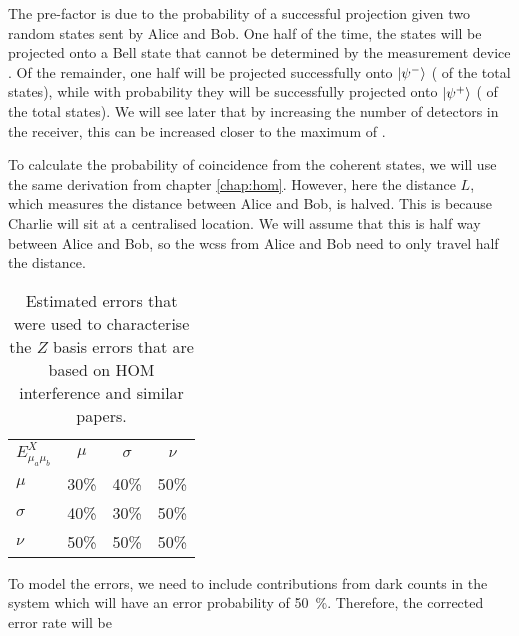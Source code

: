 The  pre-factor is due to the probability of a successful projection given two random states sent by Alice and Bob. One half of the time, the states will be projected onto a Bell state that cannot be determined by the measurement device \cite{walborn2003, Mattle1996}. Of the remainder, one half will be projected successfully onto $\ket{\psi^-}$ ( of the total states), while with probability  they will be successfully projected onto $\ket{\psi^+}$ ( of the total states). We will see later that by increasing the number of detectors in the receiver, this can be increased closer to the maximum of .

To calculate the probability of coincidence from the coherent states, we will use the same derivation from chapter \ref{chap:hom}. However, here the distance $L$, which measures the distance between Alice and Bob, is halved. This is because Charlie will sit at a centralised location. We will assume that this is half way between Alice and Bob, so the \acp{wcs} from Alice and Bob need to only travel half the distance. 

\begin{table}[t]
	\centering
	\begin{tabular}{lccc}
		$E^X_{\mu_a\mu_b}$ & $\mu$ & $\sigma$ & $\nu$ \\
		$\mu$             	& 30\%  	& 40\%                      	& 50\%                      \\
		$\sigma$    		& 40\%  	& 30\%                      	& 50\%                      \\
		$\nu$              	& 50\%  	& 50\%                       	& 50\%                   
	\end{tabular}
	\caption[Table of estimated errors for modelling]{Estimated errors that were used to characterise the $Z$ basis errors that are based on \ac{HOM} interference and similar papers.}
	\label{tab:x-errors}
\end{table}


To model the errors, we need to include contributions from dark counts in the system which will have an error probability of \SI{50}{\percent}. Therefore, the corrected error rate will be

